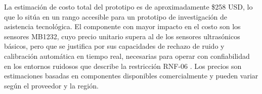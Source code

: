 La estimación de costo total del prototipo es de aproximadamente \$258 USD, lo que lo
sitúa en un rango accesible para un prototipo de investigación de asistencia tecnológica.
El componente con mayor impacto en el costo son los sensores MB1232, cuyo precio unitario
supera al de los sensores ultrasónicos básicos, pero que se justifica por sus capacidades
de rechazo de ruido y calibración automática en tiempo real, necesarias para operar con
confiabilidad en los entornos ruidosos que describe la restricción RNF-06
\cite{mb1232_datasheet}. Los precios son estimaciones basadas en componentes disponibles
comercialmente y pueden variar según el proveedor y la región.